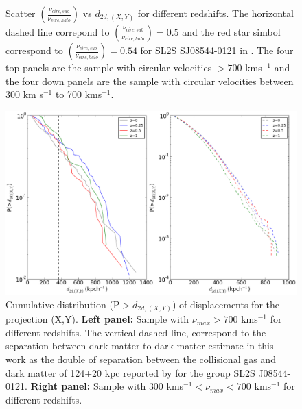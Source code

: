 \documentclass{emulateapj}
\begin{document}
\begin{figure}
\begin{center}
\end{center}
\caption{Scatter $\left(\frac{\nu_{circ,sub}}{\nu_{circ,halo}}\right)$
  vs $d_{2d,(X,Y)}$ for different redshifts. The  horizontal dashed
  line correpond to
  $\left(\frac{\nu_{circ,sub}}{\nu_{circ,halo}}\right)=0.5$ and the
  red star simbol correspond to
  $\left(\frac{\nu_{circ,sub}}{\nu_{circ,halo}}\right)=0.54$ for SL2S
  SJ08544-0121 in \citet{2013A&A...552A..80M}. The  four top panels
  are the sample with circular velocities $>700$ kms$^{-1}$ and the
  four down panels are the sample with  circular velocities between
  300 km s$^{-1}$ to 700 kms$^{-1}$.} 
\label{newparameter}
\end{figure}



\begin{figure}
\begin{center}
\includegraphics[width=1.1\textwidth]{Figures_eps/figure_7_1.eps}
\end{center}
\caption{Cumulative distribution (P$>d_{2d,(X,Y)}$) of displacements
  for the projection (X,Y). {\bf Left panel:} Sample with
  $\nu_{max}>700$ kms$^{-1}$  for different redshifts. The vertical
  dashed line, correspond to the separation between dark matter to
  dark matter estimate in this work as the double of separation
  between the collisional gas and dark matter of 124$\pm$20 kpc
  reported by \citet{gastaldello} for the group SL2S J08544-0121.
  {\bf Right panel:} Sample with $300 $ kms$^{-1} <\nu_{max}<700 $
  kms$^{-1}$ for different redshifts.}  
\label{displacements}
\end{figure}
\end{document}
